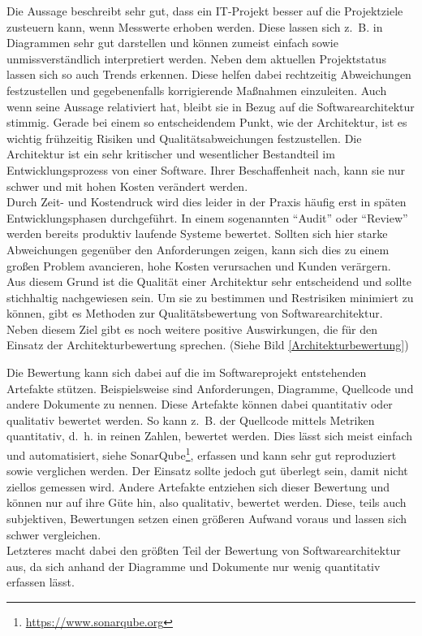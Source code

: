Die Aussage beschreibt sehr gut, dass ein IT-Projekt besser auf die Projektziele
zusteuern kann, wenn Messwerte erhoben werden. Diese lassen sich z.~B. in Diagrammen sehr gut darstellen und können zumeist einfach sowie unmissverständlich interpretiert werden. Neben dem aktuellen Projektstatus lassen sich so auch Trends erkennen. Diese helfen dabei rechtzeitig Abweichungen festzustellen und gegebenenfalls korrigierende Maßnahmen einzuleiten\cite{Starke2015}. Auch wenn \citeauthor{DeMarco2009} \citeyear{DeMarco2009} seine Aussage relativiert hat\cite{DeMarco2009}, bleibt sie in Bezug auf die Softwarearchitektur stimmig.
Gerade bei einem so entscheidendem Punkt, wie der Architektur, ist es wichtig frühzeitig
Risiken und Qualitätsabweichungen festzustellen. Die Architektur ist ein sehr kritischer
und wesentlicher Bestandteil im Entwicklungsprozess von einer Software. Ihrer Beschaffenheit nach,
kann sie nur schwer und mit hohen Kosten verändert werden.\\
Durch Zeit- und Kostendruck wird dies leider in der Praxis häufig erst in späten Entwicklungsphasen durchgeführt. 
In einem sogenannten \enquote{Audit} oder \enquote{Review} werden bereits produktiv laufende Systeme bewertet\cite{Starke2015}.
Sollten sich hier starke Abweichungen gegenüber den Anforderungen zeigen, kann sich dies zu einem großen Problem 
avancieren, hohe Kosten verursachen und Kunden verärgern.\\
Aus diesem Grund ist die Qualität einer Architektur sehr entscheidend und sollte stichhaltig nachgewiesen sein.
Um sie zu bestimmen und Restrisiken minimiert zu können, gibt es Methoden zur Qualitätsbewertung 
von Softwarearchitektur. Neben diesem Ziel gibt es noch weitere positive Auswirkungen, die für den Einsatz der Architekturbewertung sprechen. (Siehe Bild \ref{Architekturbewertung})


Die Bewertung kann sich dabei auf die im Softwareprojekt entstehenden Artefakte stützen. Beispielsweise sind
Anforderungen, Diagramme, Quellcode und andere Dokumente zu nennen. Diese Artefakte können dabei quantitativ 
oder qualitativ bewertet werden. So kann z.~B. der Quellcode mittels Metriken quantitativ, d.~h. in reinen Zahlen, bewertet werden. Dies lässt sich meist einfach und automatisiert, siehe SonarQube\footnote{\url{https://www.sonarqube.org}}, erfassen und kann sehr gut reproduziert sowie verglichen werden. Der Einsatz sollte jedoch gut überlegt sein, damit nicht ziellos gemessen wird.
Andere Artefakte entziehen sich dieser Bewertung und können nur auf ihre Güte hin, also qualitativ, bewertet werden. Diese, teils auch subjektiven, Bewertungen setzen einen größeren Aufwand voraus und lassen sich schwer vergleichen.\\  
Letzteres macht dabei den größten Teil der Bewertung von Softwarearchitektur aus, da sich anhand der Diagramme und Dokumente nur wenig quantitativ erfassen lässt.     

